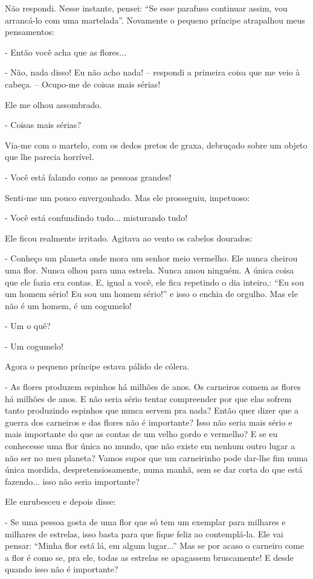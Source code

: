 Não respondi. Nesse instante, pensei: ``Se esse parafuso continuar
assim, vou arrancá-lo com uma martelada''. Novamente o pequeno príncipe
atrapalhou meus pensamentos:

- Então você acha que as flores...

- Não, nada disso! Eu não acho nada! -- respondi a primeira coisa que me
veio à cabeça. -- Ocupo-me de coisas mais sérias!

Ele me olhou assombrado.

- Coisas mais sérias?

Via-me com o martelo, com os dedos pretos de graxa, debruçado sobre um
objeto que lhe parecia horrível.

- Você está falando como as pessoas grandes!

Senti-me um pouco envergonhado. Mas ele prosseguiu, impetuoso:

- Você está confundindo tudo... misturando tudo!

Ele ficou realmente irritado. Agitava ao vento os cabelos dourados:

- Conheço um planeta onde mora um senhor meio vermelho. Ele nunca
cheirou uma flor. Nunca olhou para uma estrela. Nunca amou ninguém. A
única coisa que ele fazia era contas. E, igual a você, ele fica
repetindo o dia inteiro,: ``Eu sou um homem sério! Eu sou um homem
sério!'' e isso o enchia de orgulho. Mas ele não é um homem, é um
cogumelo!

- Um o quê?

- Um cogumelo!

Agora o pequeno príncipe estava pálido de cólera.

- As flores produzem espinhos há milhões de anos. Os carneiros comem as
flores há milhões de anos. E não seria sério tentar compreender por que
elas sofrem tanto produzindo espinhos que nunca servem pra nada? Então
quer dizer que a guerra dos carneiros e das flores não é importante?
Isso não seria mais sério e mais importante do que as contas de um velho
gordo e vermelho? E se eu conhecesse uma flor única no mundo, que não
existe em nenhum outro lugar a não ser no meu planeta? Vamos supor que
um carneirinho pode dar-lhe fim numa única mordida, despretensiosamente,
numa manhã, sem se dar corta do que está fazendo... isso não seria
importante?

Ele enrubesceu e depois disse:

- Se uma pessoa gosta de uma flor que só tem um exemplar para milhares e
milhares de estrelas, isso basta para que fique feliz ao contemplá-la.
Ele vai pensar: ``Minha flor está lá, em algum lugar...'' Mas se por
acaso o carneiro come a flor é como se, pra ele, todas as estrelas se
apagassem bruscamente! E desde quando isso não é importante?


